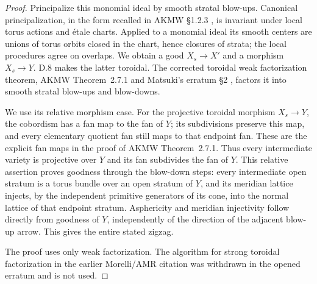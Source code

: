 \begin{proof}
Principalize this monomial ideal by smooth stratal blow-ups. Canonical principalization, in the form recalled in AKMW \S1.2.3 \cite{AKMW2002}, is invariant under local torus actions and \'etale charts. Applied to a monomial ideal its smooth centers are unions of torus orbits closed in the chart, hence closures of strata; the local procedures agree on overlaps. We obtain a good $X_s\to X'$ and a morphism $X_s\to Y$. D.8 makes the latter toroidal. The corrected toroidal weak factorization theorem, AKMW Theorem~2.7.1 and Matsuki's erratum \S2 \cite{Matsuki2000}, factors it into smooth stratal blow-ups and blow-downs.

We use its relative morphism case. For the projective toroidal morphism $X_s\to Y$, the cobordism has a fan map to the fan of $Y$; its subdivisions preserve this map, and every elementary quotient fan still maps to that endpoint fan. These are the explicit fan maps in the proof of AKMW Theorem~2.7.1. Thus every intermediate variety is projective over $Y$ and its fan subdivides the fan of $Y$. This relative assertion proves goodness through the blow-down steps: every intermediate open stratum is a torus bundle over an open stratum of $Y$, and its meridian lattice injects, by the independent primitive generators of its cone, into the normal lattice of that endpoint stratum. Asphericity and meridian injectivity follow directly from goodness of $Y$, independently of the direction of the adjacent blow-up arrow. This gives the entire stated zigzag.

The proof uses only weak factorization. The algorithm for strong toroidal factorization in the earlier Morelli/AMR citation was withdrawn in the opened erratum and is not used.
\end{proof}

